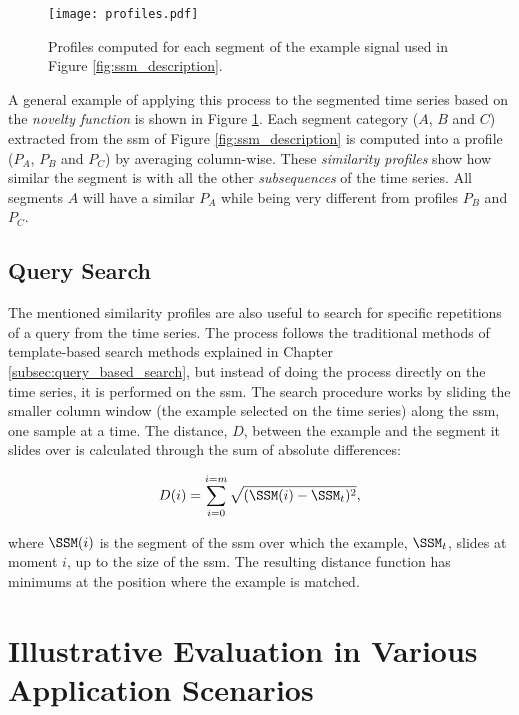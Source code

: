 \begin{figure}
\centering
\texttt{[image: profiles.pdf]}
\caption{Profiles computed for each segment of the example signal used in Figure \ref{fig:ssm_description}.}
\label{fig:profiles}
\end{figure}

A general example of applying this process to the segmented time series based on the \textit{novelty function} is shown in Figure \ref{fig:profiles}. Each segment category ($A$, $B$ and $C$) extracted from the \gls{ssm} of Figure \ref{fig:ssm_description} is computed into a profile ($P_A$, $P_B$ and $P_C$) by averaging column-wise. These \textit{similarity profiles} show how similar the segment is with all the other \textit{subsequences} of the time series. All segments $A$ will have a similar $P_A$ while being very different from profiles $P_B$ and $P_C$. 

\subsection{Query Search}
\label{subsec:query_based}

The mentioned similarity profiles are also useful to search for specific repetitions of a query from the time series. The process follows the traditional methods of template-based search methods explained in Chapter \ref{subsec:query_based_search}, but instead of doing the process directly on the time series, it is performed on the \gls{ssm}. The search procedure works by sliding the smaller column window (the example selected on the time series) along the \gls{ssm}, one sample at a time. The distance, $D$, between the example and the segment it slides over is calculated through the sum of absolute differences:

\begin{equation}
\label{eq:subsec_search}
    D(i) = \sum_{i=0}^{i=m}{\sqrt{(\SSM(i) - \SSM_t)^2}},
\end{equation}

where $\SSM(i)$ is the segment of the \gls{ssm} over which the example, $\SSM_t$, slides at moment $i$, up to the size of the \gls{ssm}. The resulting distance function has minimums at the position where the example is matched.

\section{Illustrative Evaluation in Various Application Scenarios}
\label{sec:use_cases_ssm}


